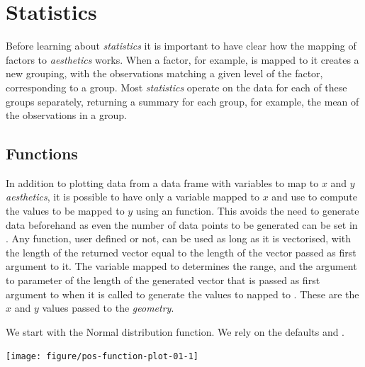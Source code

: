 \documentclass[krantz2]{krantz}\usepackage{knitr}%
\begin{document}

\section{Statistics}\label{sec:plot:statistics}

Before learning about \ggplot \emph{statistics} it is important to have clear how the mapping of factors to \emph{aesthetics} works. When a factor, for example, is mapped to  it creates a new grouping, with the observations matching a given level of the factor, corresponding to a group. Most \emph{statistics} operate on the data for each of these groups separately, returning a summary for each group, for example, the mean of the observations in a group.

\subsection{Functions}\label{sec:plot:function}
In addition to plotting data from a data frame with variables to map to $x$ and $y$ \emph{aesthetics}, it is possible to have only a variable mapped to $x$ and use  to compute the values to be mapped to $y$ using an \Rlang function. This avoids the need to generate data beforehand as even the number of data points to be generated can be set in . Any \Rlang function, user defined or not, can be used as long as it is vectorised, with the length of the returned vector equal to the length of the vector passed as first argument to it. The variable mapped to  determines the range, and the argument to parameter  of  the length of the generated vector that is passed as first argument to  when it is called to generate the values to napped to . These are the $x$ and $y$ values passed to the \emph{geometry}.

We start with the Normal distribution function. We rely on the defaults  and .

\begin{knitrout}\footnotesize
{}\color{fgcolor}\begin{kframe}
\begin{alltt}
\hlstd{(}\hlstd{(} \hlstd{=} \hlopt{-}\hlopt{:}\hlstd{),} \hlstd{(}  \hlopt{+}
  \hlstd{(} 
\end{alltt}
\end{kframe}

{\centering \texttt{[image: figure/pos-function-plot-01-1]} 

}



\end{knitrout}
\end{document}
